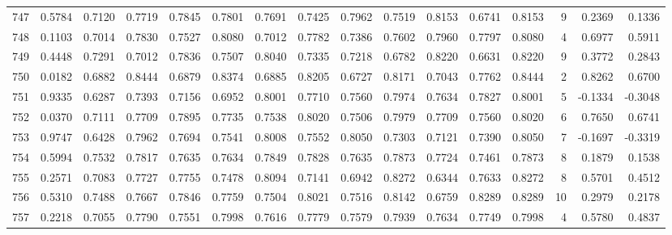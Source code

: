 \begin{tabular}{lrrrrrrrrrrrrrrr}
747 &      0.5784 &  0.7120 &  0.7719 &  0.7845 &  0.7801 &  0.7691 &  0.7425 &  0.7962 &  0.7519 &  0.8153 &   0.6741 &     0.8153 &      9 &                    0.2369 &                     0.1336 \\
748 &      0.1103 &  0.7014 &  0.7830 &  0.7527 &  0.8080 &  0.7012 &  0.7782 &  0.7386 &  0.7602 &  0.7960 &   0.7797 &     0.8080 &      4 &                    0.6977 &                     0.5911 \\
749 &      0.4448 &  0.7291 &  0.7012 &  0.7836 &  0.7507 &  0.8040 &  0.7335 &  0.7218 &  0.6782 &  0.8220 &   0.6631 &     0.8220 &      9 &                    0.3772 &                     0.2843 \\
750 &      0.0182 &  0.6882 &  0.8444 &  0.6879 &  0.8374 &  0.6885 &  0.8205 &  0.6727 &  0.8171 &  0.7043 &   0.7762 &     0.8444 &      2 &                    0.8262 &                     0.6700 \\
751 &      0.9335 &  0.6287 &  0.7393 &  0.7156 &  0.6952 &  0.8001 &  0.7710 &  0.7560 &  0.7974 &  0.7634 &   0.7827 &     0.8001 &      5 &                   -0.1334 &                    -0.3048 \\
752 &      0.0370 &  0.7111 &  0.7709 &  0.7895 &  0.7735 &  0.7538 &  0.8020 &  0.7506 &  0.7979 &  0.7709 &   0.7560 &     0.8020 &      6 &                    0.7650 &                     0.6741 \\
753 &      0.9747 &  0.6428 &  0.7962 &  0.7694 &  0.7541 &  0.8008 &  0.7552 &  0.8050 &  0.7303 &  0.7121 &   0.7390 &     0.8050 &      7 &                   -0.1697 &                    -0.3319 \\
754 &      0.5994 &  0.7532 &  0.7817 &  0.7635 &  0.7634 &  0.7849 &  0.7828 &  0.7635 &  0.7873 &  0.7724 &   0.7461 &     0.7873 &      8 &                    0.1879 &                     0.1538 \\
755 &      0.2571 &  0.7083 &  0.7727 &  0.7755 &  0.7478 &  0.8094 &  0.7141 &  0.6942 &  0.8272 &  0.6344 &   0.7633 &     0.8272 &      8 &                    0.5701 &                     0.4512 \\
756 &      0.5310 &  0.7488 &  0.7667 &  0.7846 &  0.7759 &  0.7504 &  0.8021 &  0.7516 &  0.8142 &  0.6759 &   0.8289 &     0.8289 &     10 &                    0.2979 &                     0.2178 \\
757 &      0.2218 &  0.7055 &  0.7790 &  0.7551 &  0.7998 &  0.7616 &  0.7779 &  0.7579 &  0.7939 &  0.7634 &   0.7749 &     0.7998 &      4 &                    0.5780 &                     0.4837 \\

\end{tabular}
